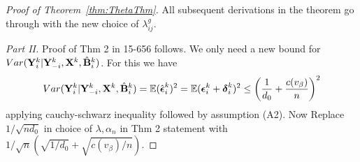 \documentclass[fleqn,11pt]{article}
\numberwithin{equation}{section}
\begin{document}
\begin{proof}[Proof of Theorem~\ref{thm:ThetaThm}]
All subsequent derivations in the theorem go through with the new choice of $\lambda_{ij}^g$.

%
%
%

\textit{Part II.} Proof of Thm 2 in 15-656 follows. We only need a new bound for $Var ({\mathbf{Y}}_i^k | {\mathbf{Y}}_{-i}^k, {\mathbf{X}}^k, \hat {{\mathbf{B}}}_i^k)$. For this we have
%
$$ Var ({\mathbf{Y}}_i^k | {\mathbf{Y}}_{-i}^k, {\mathbf{X}}^k, \hat {{\mathbf{B}}}_i^k) = {\mathbb{E}} (\hat {{\boldsymbol{\epsilon}}}_i^k)^2
= {\mathbb{E}} ( {\boldsymbol{\epsilon}}_i^k + {\boldsymbol{\delta}}_i^k)^2
\leq \left( \frac{1}{d_0} + \frac{c(v_\beta)}{n} \right)^2
$$
%
applying cauchy-schwarz inequality followed by assumption (A2). Now Replace $1/\sqrt{n d_0}$ in choice of $\lambda, \alpha_n$ in Thm 2 statement with $1/\sqrt{n} (\sqrt{1/d_0} + \sqrt{c(v_\beta)/ n})$.

\end{proof}
\end{document}
